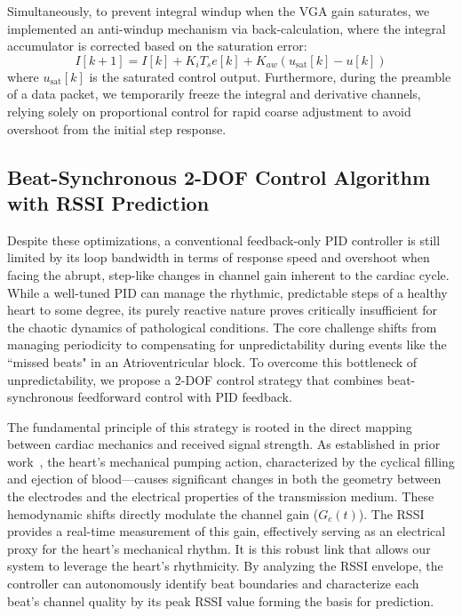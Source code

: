 \documentclass[journal]{IEEEtran}
\begin{document}
Simultaneously, to prevent integral windup when the VGA gain saturates, we implemented an anti-windup mechanism via back-calculation, where the integral accumulator is corrected based on the saturation error:
\begin{equation}
    I[k+1]=I[k]+K_i T_s e[k]+K_{aw}(u_{\text{sat}}[k]-u[k])
\end{equation}
where $u_{\text{sat}}[k]$ is the saturated control output. Furthermore, during the preamble of a data packet, we temporarily freeze the integral and derivative channels, relying solely on proportional control for rapid coarse adjustment to avoid overshoot from the initial step response.

\subsection{Beat-Synchronous 2-DOF Control Algorithm with RSSI Prediction}
\label{subsec:2dof_control_algorithm}

Despite these optimizations, a conventional feedback-only PID controller is still limited by its loop bandwidth in terms of response speed and overshoot when facing the abrupt, step-like changes in channel gain inherent to the cardiac cycle. While a well-tuned PID can manage the rhythmic, predictable steps of a healthy heart to some degree, its purely reactive nature proves critically insufficient for the chaotic dynamics of pathological conditions. The core challenge shifts from managing periodicity to compensating for unpredictability during events like the ``missed beats" in an Atrioventricular block. To overcome this bottleneck of unpredictability, we propose a 2-DOF control strategy that combines beat-synchronous feedforward control with PID feedback.

The fundamental principle of this strategy is rooted in the direct mapping between cardiac mechanics and received signal strength. As established in prior work~\cite{li2025Adynamic,li2025dynamic}, the heart's mechanical pumping action, characterized by the cyclical filling and ejection of blood—causes significant changes in both the geometry between the electrodes and the electrical properties of the transmission medium. These hemodynamic shifts directly modulate the channel gain ($G_c(t)$). The RSSI provides a real-time measurement of this gain, effectively serving as an electrical proxy for the heart's mechanical rhythm. It is this robust link that allows our system to leverage the heart's rhythmicity. By analyzing the RSSI envelope, the controller can autonomously identify beat boundaries and characterize each beat's channel quality by its peak RSSI value forming the basis for prediction.
\end{document}
